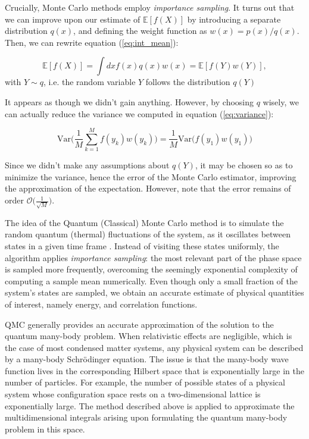 Crucially, Monte Carlo methods employ \emph{importance sampling}. It turns out that we can improve upon our estimate of $\mathbb{E} [f(X)]$ by introducing a separate distribution $q(x)$, and defining the weight function as $w(x) = p(x)/ q(x)$. Then, we can rewrite equation (\ref{eq:int_mean}):

\begin{equation}
\mathbb{E} [f(X)] = \int dx f(x) q(x) w(x) = \mathbb{E} [f(Y) w(Y)],
\end{equation}
with $Y \sim q$, i.e. the random variable $Y$ follows the distribution $q(Y)$

It appears as though we didn't gain anything. However, by choosing $q$ wisely, we can actually reduce the variance we computed in equation (\ref{eq:variance}):

\begin{equation}
\text{Var}\bigg( \frac{1}{M} \sum_{k=1}^M f(y_k) w(y_k) \bigg) = \frac{1}{M} \text{Var}\bigg( f(y_1) w(y_1) \bigg)
\end{equation}

Since we didn't make any assumptions about $q(Y)$, it may be chosen so as to minimize the variance, hence the error of the Monte Carlo estimator, improving the approximation of the expectation. However, note that the error remains of order $\mathcal{O}\big(\frac{1}{\sqrt{M}}\big)$.

The idea of the Quantum (Classical) Monte Carlo method is to simulate the random quantum (thermal) fluctuations of the system, as it oscillates between states in a given time frame \cite{Newman1999}. Instead of visiting these states uniformly, the algorithm applies \emph{importance sampling}: the most relevant part of the phase space is sampled more frequently, overcoming the seemingly exponential complexity of computing a sample mean numerically. Even though only a small fraction of the system's states are sampled, we obtain an accurate estimate of physical quantities of interest, namely energy, and correlation functions.

QMC generally provides an accurate approximation of the solution to the quantum many-body problem. When relativistic effects are negligible, which is the case of most condensed matter systems, any physical system can be described by a many-body Schr\"odinger equation. The issue is that the many-body wave function lives in the corresponding Hilbert space that is  exponentially large in the number of particles. For example, the number of possible states of a physical system whose configuration space rests on a two-dimensional lattice is exponentially large. The method described above is applied to approximate the multidimensional integrals arising upon formulating the quantum many-body problem in this space.

